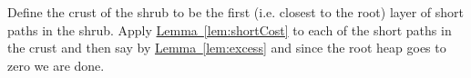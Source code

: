 \documentclass[11pt]{article}
\newtheorem{lemma}[theorem]{Lemma}
\theoremstyle{definition}
\newcommand{\Lem}[1]{\hyperref[lem:#1]{Lemma~\ref*{lem:#1}}} %
\newcommand{\remove}[1]{}
\newcommand{\pth}[2][\!]{#1\left({#2}\right)}
\begin{document}
{\remove{
% 
% 
% 
% 
}


Define the crust of the shrub to be the first (i.e. closest to the root) layer of short paths in the shrub.  Apply \Lem{shortCost} to each of the short paths in the crust and then 
say by \Lem{excess} and since the root heap goes to zero we are done.



}
\end{document}
